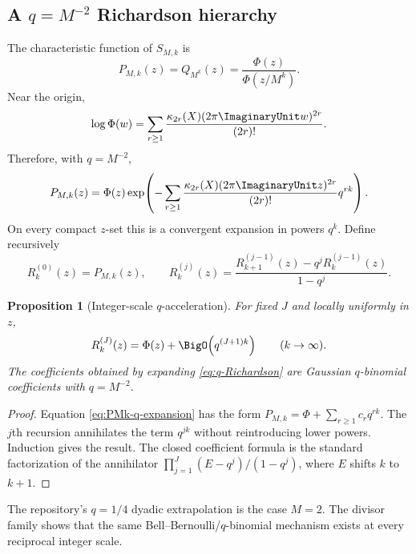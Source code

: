 \documentclass[11pt,oneside]{article}
\newtheorem{proposition}[theorem]{Proposition}
\theoremstyle{definition}
\theoremstyle{remark}
\begin{document}
\subsection{A $q=M^{-2}$ Richardson hierarchy}

The characteristic function of $S_{M,k}$ is
\begin{equation}
 P_{M,k}(z)=Q_{M^k}(z)=\frac{\Phi(z)}{\Phi(z/M^k)}.
 \label{eq:PMk}
\end{equation}
Near the origin,
\begin{equation}
 \log\Phi(w)=\sum_{r\ge1}
 \frac{\kappa_{2r}(X)(2\pi\ImaginaryUnit w)^{2r}}{(2r)!}.
 \label{eq:logPhi-cumulant}
\end{equation}
Therefore, with $q=M^{-2}$,
\begin{equation}
 P_{M,k}(z)=\Phi(z)
 \exp\!\left(-\sum_{r\ge1}
 \frac{\kappa_{2r}(X)(2\pi\ImaginaryUnit z)^{2r}}{(2r)!}q^{rk}\right).
 \label{eq:PMk-q-expansion}
\end{equation}
On every compact $z$-set this is a convergent expansion in powers $q^k$.  Define recursively
\begin{equation}
 R_k^{(0)}(z)=P_{M,k}(z),
 \qquad
 R_k^{(j)}(z)=
 \frac{R_{k+1}^{(j-1)}(z)-q^jR_k^{(j-1)}(z)}{1-q^j}.
 \label{eq:q-Richardson}
\end{equation}

\begin{proposition}[Integer-scale $q$-acceleration]
\label{prop:q-accel}
For fixed $J$ and locally uniformly in $z$,
\begin{equation}
 R_k^{(J)}(z)=\Phi(z)+\BigO\!\left(q^{(J+1)k}\right)
 \qquad(k\to\infty).
 \label{eq:q-accel-rate}
\end{equation}
The coefficients obtained by expanding \eqref{eq:q-Richardson} are Gaussian
$q$-binomial coefficients with $q=M^{-2}$.
\end{proposition}

\begin{proof}
Equation \eqref{eq:PMk-q-expansion} has the form
$P_{M,k}=\Phi+\sum_{r\ge1}c_rq^{rk}$.  The $j$th recursion annihilates the term
$q^{jk}$ without reintroducing lower powers.  Induction gives the result.  The closed
coefficient formula is the standard factorization of the annihilator
$\prod_{j=1}^J(E-q^j)/(1-q^j)$, where $E$ shifts $k$ to $k+1$.
\end{proof}

The repository's $q=1/4$ dyadic extrapolation is the case $M=2$.  The divisor family
shows that the same Bell--Bernoulli/$q$-binomial mechanism exists at every reciprocal
integer scale.
\end{document}

